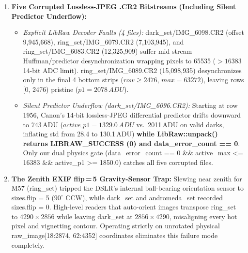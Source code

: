 \documentclass[10pt,twocolumn,letterpaper]{article}
\DeclareRobustCommand{\code}[1]{\texttt{#1}}
\def\code#1{#1}%
\def\allowbreak{}%
\begin{document}
\begin{enumerate}
  \item \textbf{Five Corrupted Lossless-JPEG \code{.CR2} Bitstreams (Including Silent Predictor Underflow):}
  \begin{itemize}
    \item \emph{Explicit \code{LibRaw} Decoder Faults (4 files):} \code{dark\_set/\allowbreak IMG\_6098.CR2} (offset \code{9,945,668}), \code{ring\_set/\allowbreak IMG\_6079.CR2} (\code{7,103,945}), and \code{ring\_set/\allowbreak IMG\_6083.CR2} (\code{12,325,909}) suffer mid-stream Huffman/predictor desynchronization wrapping pixels to \code{65535} ($> \code{16383}$ 14-bit ADC limit). \code{ring\_set/\allowbreak IMG\_6089.CR2} (\code{15,098,935}) desynchronizes only in the final \code{4} bottom strips ($\code{row} \ge \code{2476}$, $\code{max} = \code{63272}$), leaving rows \code{[0, 2476)} pristine ($\code{p1} = \code{2078\,ADU}$).
    \item \emph{Silent Predictor Underflow (\code{dark\_set/\allowbreak IMG\_6096.CR2}):} Starting at row \code{1956}, Canon's 14-bit lossless-JPEG differential predictor drifts downward to \code{743\,ADU} ($\code{active\_p1} = \code{1329.0\,ADU}$ vs.\ \code{2011\,ADU} on valid darks, inflating \code{std} from \code{28.4} to \code{130.1\,ADU}) \textbf{while \code{LibRaw::unpack()} returns \code{LIBRAW\_SUCCESS} (\code{0}) and \code{data\_error\_count == 0}}. Only our dual physics gate (\code{data\_error\_count == 0 \&\& active\_max <= 16383 \&\& active\_p1 >= 1850.0}) catches all five corrupted files.
  \end{itemize}

  \item \textbf{The Zenith EXIF \code{flip\,=\,5} Gravity-Sensor Trap:}
  Slewing near zenith for M57 (\code{ring\_set}) tripped the DSLR's internal ball-bearing orientation sensor to \code{sizes.flip = 5} ($90^\circ$ CCW), while \code{dark\_set} and \code{andromeda\_set} recorded \code{sizes.flip = 0}. High-level readers that auto-orient images transpose \code{ring\_set} to $4290 \times 2856$ while leaving \code{dark\_set} at $2856 \times 4290$, misaligning every hot pixel and vignetting contour. Operating strictly on unrotated physical \code{raw\_image[18:2874, 62:4352]} coordinates eliminates this failure mode completely.


\end{enumerate}
\end{document}
